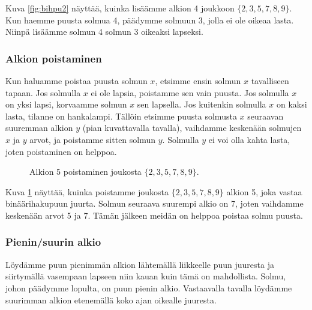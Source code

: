 Kuva \ref{fig:bihpu2} näyttää, kuinka lisäämme alkion 4
joukkoon $\{2,3,5,7,8,9\}$.
Kun haemme puusta solmua 4, päädymme solmuun 3,
jolla ei ole oikeaa lasta.
Niinpä lisäämme solmun 4 solmun 3 oikeaksi lapseksi.

\subsubsection{Alkion poistaminen}

Kun haluamme poistaa puusta solmun $x$, etsimme ensin
solmun $x$ tavalliseen tapaan.
Jos solmulla $x$ ei ole lapsia, poistamme sen vain puusta.
Jos solmulla $x$ on yksi lapsi, korvaamme solmun $x$
sen lapsella.
Jos kuitenkin solmulla $x$ on kaksi lasta,
tilanne on hankalampi.
Tällöin etsimme puusta solmusta $x$ seuraavan
suuremman alkion $y$ (pian kuvattavalla tavalla), vaihdamme keskenään
solmujen $x$ ja $y$ arvot,
ja poistamme sitten solmun $y$.
Solmulla $y$ ei voi olla kahta lasta, joten poistaminen on helppoa.

\begin{figure}
\center
{}
\caption{Alkion 5 poistaminen joukosta $\{2,3,5,7,8,9\}$.}
\label{fig:bihpu3}
\end{figure}


Kuva \ref{fig:bihpu3} näyttää, kuinka poistamme joukosta $\{2,3,5,7,8,9\}$
alkion 5, joka vastaa binäärihakupuun juurta.
Solmun seuraava suurempi alkio on 7,
joten vaihdamme keskenään arvot 5 ja 7.
Tämän jälkeen meidän on helppoa poistaa solmu puusta.

\subsubsection{Pienin/suurin alkio}

Löydämme puun pienimmän alkion lähtemällä liikkeelle
puun juuresta ja siirtymällä vasempaan lapseen niin
kauan kuin tämä on mahdollista.
Solmu, johon päädymme lopulta, on puun pienin alkio.
Vastaavalla tavalla löydämme suurimman alkion
etenemällä koko ajan oikealle juuresta.

